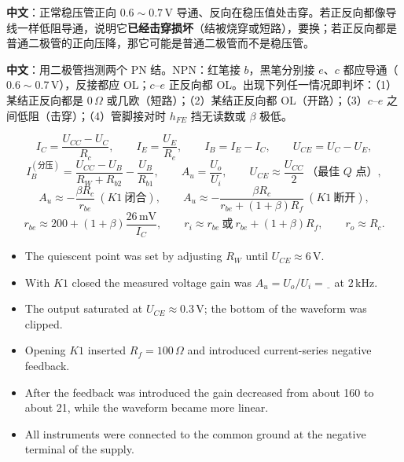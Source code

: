 \documentclass[11pt]{ctexart}
\let\orighdr\hdr
\renewcommand{\hdr}[2]{\needspace{9\baselineskip}\orighdr{#1}{#2}}
\let\origsubhdr\subhdr
\renewcommand{\subhdr}[1]{\needspace{3\baselineskip}\origsubhdr{#1}}
\begin{document}
\noindent\textbf{中文}：正常稳压管正向 $0.6\sim0.7\,\mathrm{V}$ 导通、反向在稳压值处击穿。若正反向都像导线一样低阻导通，说明它\textbf{已经击穿损坏}（结被烧穿或短路），要换；若正反向都是普通二极管的正向压降，那它可能是普通二极管而不是稳压管。



\noindent\textbf{中文}：用二极管挡测两个 PN 结。NPN：红笔接 $b$，黑笔分别接 $e$、$c$ 都应导通（$0.6\sim0.7\,\mathrm{V}$），反接都应 OL；$c$--$e$ 正反向都 OL。出现下列任一情况即判坏：（1）某结正反向都是 $0\,\Omega$ 或几欧（短路）；（2）某结正反向都 OL（开路）；（3）$c$--$e$ 之间低阻（击穿）；（4）管脚接对时 $h_{FE}$ 挡无读数或 $\beta$ 极低。



\[
I_C=\frac{U_{CC}-U_C}{R_c},\qquad I_E=\frac{U_E}{R_e},\qquad I_B=I_E-I_C,\qquad U_{CE}=U_C-U_E,
\]
\[
I_B^{(\text{分压})}=\frac{U_{CC}-U_B}{R_W+R_{b2}}-\frac{U_B}{R_{b1}},\qquad
A_u=\frac{U_o}{U_i},\qquad U_{CE}\approx\frac{U_{CC}}{2}\ \text{（最佳 }Q\text{ 点）},
\]
\[
A_u\approx-\frac{\beta R_c}{r_{be}}\ (K1\ \text{闭合}),\qquad
A_u\approx-\frac{\beta R_c}{r_{be}+(1+\beta)R_f}\ (K1\ \text{断开}),
\]
\[
r_{be}\approx200+(1+\beta)\frac{26\,\mathrm{mV}}{I_C},\qquad
r_i\approx r_{be}\ \text{或}\ r_{be}+(1+\beta)R_f,\qquad r_o\approx R_c .
\]


\begin{itemize}
  \item The quiescent point was set by adjusting $R_W$ until $U_{CE}\approx6\,\mathrm{V}$.
  \item With $K1$ closed the measured voltage gain was $A_u=U_o/U_i=\underline{\ \ }$ at $2\,\mathrm{kHz}$.
  \item The output saturated at $U_{CE}\approx0.3\,\mathrm{V}$; the bottom of the waveform was clipped.
  \item Opening $K1$ inserted $R_f=100\,\Omega$ and introduced current-series negative feedback.
  \item After the feedback was introduced the gain decreased from about 160 to about 21, while the waveform became more linear.
  \item All instruments were connected to the common ground at the negative terminal of the supply.
\end{itemize}
\end{document}
